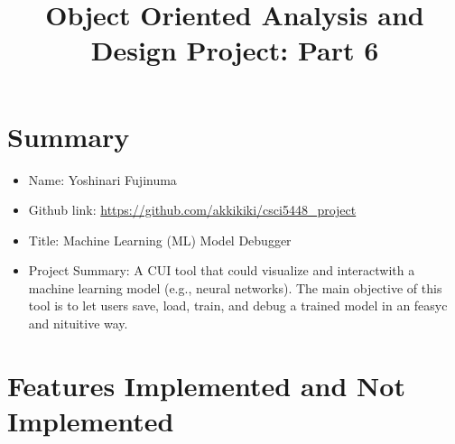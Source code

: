 \documentclass[11pt]{article}
\begin{document}
\vspace{-1cm}
\title{\vspace{-2ex} Object Oriented Analysis and Design Project: Part 6\vspace{-2ex}}
\date{\vspace{-6ex}}
\maketitle


\section{Summary}
\begin{itemize}[leftmargin=4\parindent,itemsep=-1ex]
 \item Name: Yoshinari Fujinuma
 \item Github link: \url{https://github.com/akkikiki/csci5448_project}
 \item Title: Machine Learning (ML) Model Debugger
 \item Project Summary: A CUI tool that could visualize and interactwith a  machine learning model (e.g., neural networks). The main objective of this tool is to let users save, load, train, and debug a trained model in an feasyc and nituitive way. 
\end{itemize}

\section{Features Implemented and Not Implemented}
\end{document}
